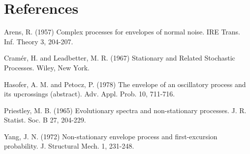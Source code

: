 \documentclass{article}
\begin{document}
\section*{References}
\begin{enumerate}[label={[\arabic*]}]
\item\label{arens} Arens, R. (1957) Complex processes for envelopes of normal noise. IRE Trans. Inf. Theory 3, 204-207.
\item\label{cramerleadbetter} Cramér, H. and Leadbetter, M. R. (1967) Stationary and Related Stochastic Processes. Wiley, New York.
\item\label{hasoferpetocz} Hasofer, A. M. and Petocz, P. (1978) The envelope of an oscillatory process and its upcrossings (abstract). Adv. Appl. Prob. 10, 711-716.
\item\label{priestley} Priestley, M. B. (1965) Evolutionary spectra and non-stationary processes. J. R. Statist. Soc. B 27, 204-229.
\item\label{yang} Yang, J. N. (1972) Non-stationary envelope process and first-excursion probability. J. Structural Mech. 1, 231-248.
\end{enumerate}
\end{document}
